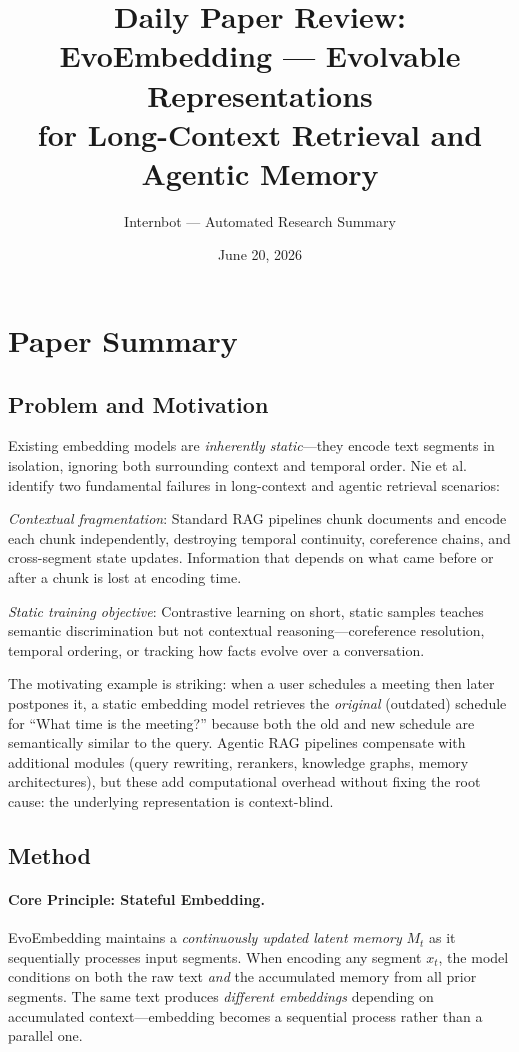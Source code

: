\documentclass[11pt,a4paper]{article}
\title{Daily Paper Review: EvoEmbedding --- Evolvable Representations\\for Long-Context Retrieval and Agentic Memory}
\author{Internbot --- Automated Research Summary}
\date{June 20, 2026}
\begin{document}
\maketitle

\section{Paper Summary}

\subsection{Problem and Motivation}

Existing embedding models are \emph{inherently static}---they encode text segments in isolation, ignoring both surrounding context and temporal order. Nie et al.~\cite{nie2026evoembedding} identify two fundamental failures in long-context and agentic retrieval scenarios:

\emph{Contextual fragmentation}: Standard RAG pipelines chunk documents and encode each chunk independently, destroying temporal continuity, coreference chains, and cross-segment state updates. Information that depends on what came before or after a chunk is lost at encoding time.

\emph{Static training objective}: Contrastive learning on short, static samples teaches semantic discrimination but not contextual reasoning---coreference resolution, temporal ordering, or tracking how facts evolve over a conversation.

The motivating example is striking: when a user schedules a meeting then later postpones it, a static embedding model retrieves the \emph{original} (outdated) schedule for ``What time is the meeting?'' because both the old and new schedule are semantically similar to the query. Agentic RAG pipelines compensate with additional modules (query rewriting, rerankers, knowledge graphs, memory architectures), but these add computational overhead without fixing the root cause: the underlying representation is context-blind.

\subsection{Method}

\paragraph{Core Principle: Stateful Embedding.} EvoEmbedding maintains a \emph{continuously updated latent memory} $M_t$ as it sequentially processes input segments. When encoding any segment $x_t$, the model conditions on both the raw text \emph{and} the accumulated memory from all prior segments. The same text produces \emph{different embeddings} depending on accumulated context---embedding becomes a sequential process rather than a parallel one.
\end{document}
